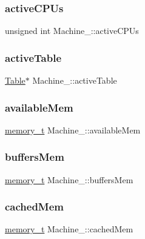 \subsubsection{\texorpdfstring{active\+C\+P\+Us}{activeCPUs}}
{\footnotesize\ttfamily unsigned int Machine\+\_\+\+::active\+C\+P\+Us}

\mbox{\label{structMachine___a03fc72fc00d68bd24128c056c70346b2}} 
\subsubsection{\texorpdfstring{active\+Table}{activeTable}}
{\footnotesize\ttfamily \hyperlink{Table_8h_a799795dd983fdfee2e48cc52cdceb05d}{Table}$\ast$ Machine\+\_\+\+::active\+Table}

\mbox{\label{structMachine___ad48aa4e8bb17977becfae0348dd0c1ca}} 
\subsubsection{\texorpdfstring{available\+Mem}{availableMem}}
{\footnotesize\ttfamily \hyperlink{Machine_8h_ac8c2c5995f64727051f4034a810e5b07}{memory\+\_\+t} Machine\+\_\+\+::available\+Mem}

\mbox{\label{structMachine___a7a2b5e5d2f9cb00188c99e78fa50de61}} 
\subsubsection{\texorpdfstring{buffers\+Mem}{buffersMem}}
{\footnotesize\ttfamily \hyperlink{Machine_8h_ac8c2c5995f64727051f4034a810e5b07}{memory\+\_\+t} Machine\+\_\+\+::buffers\+Mem}

\mbox{\label{structMachine___a0aeb16026c3e3c4745bddaa0f2ef8f03}} 
\subsubsection{\texorpdfstring{cached\+Mem}{cachedMem}}
{\footnotesize\ttfamily \hyperlink{Machine_8h_ac8c2c5995f64727051f4034a810e5b07}{memory\+\_\+t} Machine\+\_\+\+::cached\+Mem}

